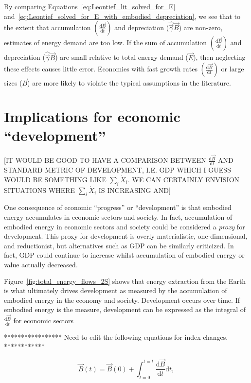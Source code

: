 \noindent{}By comparing Equations~\ref{eq:Leontief_lit_solved_for_E} 
and~\ref{eq:Leontief_solved_for_E_with_embodied_depreciation}, 
we see that to the extent that 
accumulation $\left(\frac{\mathrm{d}\vec{B}}{\mathrm{d}t}\right)$ 
and depreciation ($\hat{\vec{\gamma}}\vec{B}$) 
are non-zero, 
estimates of energy demand are too low. 
If the sum of accumulation 
$\left(\frac{\mathrm{d}\vec{B}}{\mathrm{d}t}\right)$ 
and depreciation ($\hat{\vec{\gamma}}\vec{B}$) 
are small relative to total energy demand ($\vec{E}$), 
then neglecting these effects causes little error. 
Economies with fast growth rates 
$\left(\frac{\mathrm{d}\vec{B}}{\mathrm{d}t}\right)$ 
or large sizes ($\vec{B}$) 
are more likely to violate the typical assumptions in the literature.


\section{Implications for economic ``development''}

[IT WOULD BE GOOD TO HAVE A COMPARISON BETWEEN $\frac{\mathrm{d}\vec{B}}{\mathrm{d}t}$ 
AND STANDARD METRIC OF DEVELOPMENT, 
I.E. GDP WHICH I GUESS WOULD BE SOMETHING LIKE $\sum_{i}\dot{X}_{i}$. 
WE CAN CERTAINLY ENVISION SITUATIONS WHERE $\sum_{i}\dot{X}_{i}$ IS INCREASING AND]

One consequence of economic ``progress'' or ``development'' is that embodied energy accumulates 
in economic sectors and society. 
In fact, accumulation of embodied energy in economic sectors and society 
could be considered a \emph{proxy} for development. 
This proxy for development is overly materialistic, one-dimensional, and reductionist, 
but alternatives such as GDP can be similarly criticized. 
In fact, GDP could continue to increase whilst accumulation 
of embodied energy or value actually decreased.

Figure~\ref{fig:total_energy_flows_2S} shows that energy extraction 
from the Earth is what ultimately drives development 
as measured by the accumulation of embodied energy in the economy and society. 
Development occurs over time. 
If embodied energy is the measure, 
development can be expressed as 
the integral of $\frac{\mathrm{d}\vec{B}}{\mathrm{d}t}$ for economic sectors

***************** Need to edit the following equations for index changes. ************

\begin{equation} \label{eq:Dev_Integral_Economy}
	\vec{B}(t) 
	= \vec{B}(0) 
	+ \int_{t=0}^{t=t} \frac{\mathrm{d}\vec{B}}{\mathrm{d}t}\mathrm{d}t,
\end{equation}

